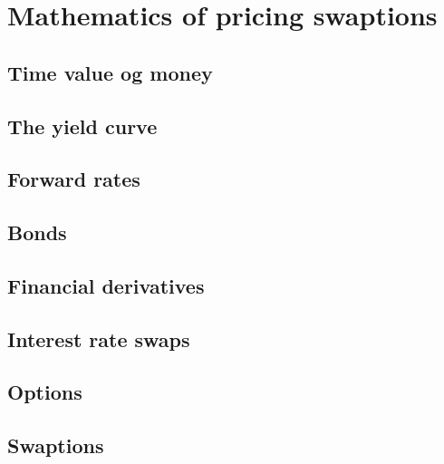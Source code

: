 \section{Mathematics of pricing swaptions}

\subsection{Time value og money}

\subsection{The yield curve}

\subsection{Forward rates}

\subsection{Bonds}

\subsection{Financial derivatives}

\subsection{Interest rate swaps}

\subsection{Options}

\subsection{Swaptions}